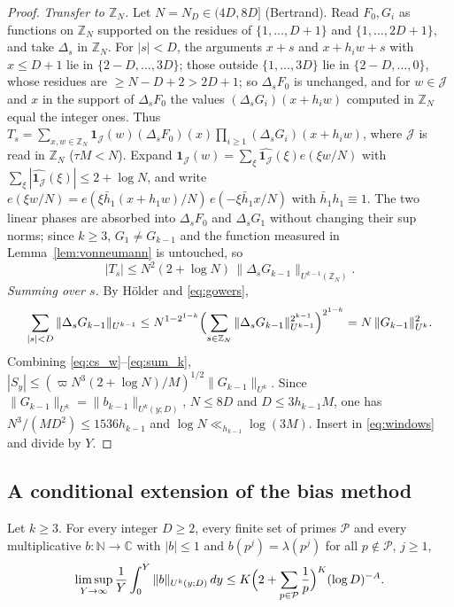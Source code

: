 \begin{proof}
\emph{Transfer to $\mathbb Z_N$.} Let $N=N_D\in(4D,8D]$ (Bertrand). Read $F_0,G_i$ as functions on $\mathbb Z_N$ supported on the residues of $\{1,\dots,D+1\}$ and $\{1,\dots,2D+1\}$, and take $\Delta_s$ in $\mathbb Z_N$. For $|s|<D$, the arguments $x+s$ and $x+h_iw+s$ with $x\le D+1$ lie in $\{2-D,\dots,3D\}$; those outside $\{1,\dots,3D\}$ lie in $\{2-D,\dots,0\}$, whose residues are $\ge N-D+2>2D+1$; so $\Delta_sF_0$ is unchanged, and for $w\in\mathcal J$ and $x$ in the support of $\Delta_sF_0$ the values $(\Delta_sG_i)(x+h_iw)$ computed in $\mathbb Z_N$ equal the integer ones. Thus $T_s=\sum_{x,w\in\mathbb Z_N}\mathbf 1_{\mathcal J}(w)(\Delta_sF_0)(x)\prod_{i\ge1}(\Delta_sG_i)(x+h_iw)$, where $\mathcal J$ is read in $\mathbb Z_N$ ($\tau M<N$). Expand $\mathbf 1_{\mathcal J}(w)=\sum_\xi\widehat{\mathbf 1_{\mathcal J}}(\xi)e(\xi w/N)$ with $\sum_\xi|\widehat{\mathbf 1_{\mathcal J}}(\xi)|\le2+\log N$, and write $e(\xi w/N)=e(\xi\bar h_1(x+h_1w)/N)\,e(-\xi\bar h_1x/N)$ with $\bar h_1h_1\equiv1$. The two linear phases are absorbed into $\Delta_sF_0$ and $\Delta_sG_1$ without changing their sup norms; since $k\ge3$, $G_1\ne G_{k-1}$ and the function measured in Lemma~\ref{lem:vonneumann} is untouched, so
\begin{equation}
|T_s|\le N^2(2+\log N)\,\|\Delta_sG_{k-1}\|_{U^{k-1}(\mathbb Z_N)} .
\label{eq:Tk_bound}
\end{equation}
\emph{Summing over $s$.} By Hölder and \eqref{eq:gowers},
\begin{equation}
\sum_{|s|<D}\|\Delta_sG_{k-1}\|_{U^{k-1}}\le N^{1-2^{1-k}}\Bigl(\sum_{s\in\mathbb Z_N}\|\Delta_sG_{k-1}\|^{2^{k-1}}_{U^{k-1}}\Bigr)^{2^{1-k}}=N\,\|G_{k-1}\|^2_{U^k}.
\label{eq:sum_k}
\end{equation}
Combining \eqref{eq:cs_w}--\eqref{eq:sum_k}, $|S_y|\le(\varpi N^3(2+\log N)/M)^{1/2}\|G_{k-1}\|_{U^k}$. Since $\|G_{k-1}\|_{U^k}=\|b_{k-1}\|_{U^k(y;D)}$, $N\le8D$ and $D\le3h_{k-1}M$, one has $N^3/(MD^2)\le1536h_{k-1}$ and $\log N\ll_{h_{k-1}}\log(3M)$. Insert in \eqref{eq:windows} and divide by $Y$.
\end{proof}

\subsection{A conditional extension of the bias method}
\label{subsec:conditional}

\begin{hypothesis}
\label{hyp:LU}
Let $k\ge3$. For every integer $D\ge2$, every finite set of primes $\mathcal P$ and every multiplicative $b:\mathbb N\to\mathbb C$ with $|b|\le1$ and $b(p^j)=\lambda(p^j)$ for all $p\notin\mathcal P$, $j\ge1$,
\begin{equation}
\limsup_{Y\to\infty}\frac1Y\int_0^Y\|b\|_{U^k(y;D)}\,dy\le K\Bigl(2+\sum_{p\in\mathcal P}\frac1p\Bigr)^K(\log D)^{-A}.
\label{eq:LU}
\end{equation}
\end{hypothesis}

